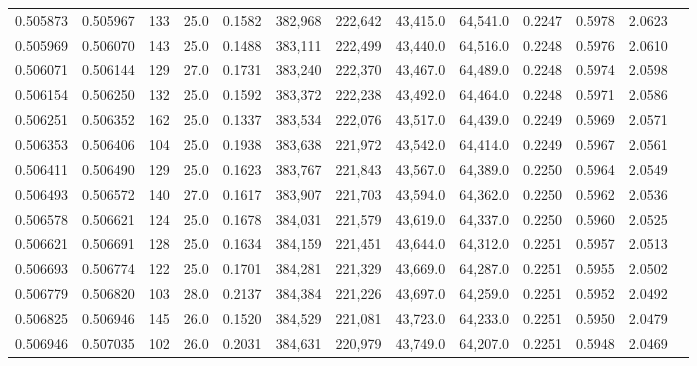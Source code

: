 \begin{tabular}{rrrrrrrrrrrrr}
0.505873 & 0.505967 &   133 & 25.0 &                                     0.1582 & 382,968 & 222,642 &  43,415.0 &  64,541.0 & 0.2247 & 0.5978 & 2.0623 \\
0.505969 & 0.506070 &   143 & 25.0 &                                     0.1488 & 383,111 & 222,499 &  43,440.0 &  64,516.0 & 0.2248 & 0.5976 & 2.0610 \\
0.506071 & 0.506144 &   129 & 27.0 &                                     0.1731 & 383,240 & 222,370 &  43,467.0 &  64,489.0 & 0.2248 & 0.5974 & 2.0598 \\
0.506154 & 0.506250 &   132 & 25.0 &                                     0.1592 & 383,372 & 222,238 &  43,492.0 &  64,464.0 & 0.2248 & 0.5971 & 2.0586 \\
0.506251 & 0.506352 &   162 & 25.0 &                                     0.1337 & 383,534 & 222,076 &  43,517.0 &  64,439.0 & 0.2249 & 0.5969 & 2.0571 \\
0.506353 & 0.506406 &   104 & 25.0 &                                     0.1938 & 383,638 & 221,972 &  43,542.0 &  64,414.0 & 0.2249 & 0.5967 & 2.0561 \\
0.506411 & 0.506490 &   129 & 25.0 &                                     0.1623 & 383,767 & 221,843 &  43,567.0 &  64,389.0 & 0.2250 & 0.5964 & 2.0549 \\
0.506493 & 0.506572 &   140 & 27.0 &                                     0.1617 & 383,907 & 221,703 &  43,594.0 &  64,362.0 & 0.2250 & 0.5962 & 2.0536 \\
0.506578 & 0.506621 &   124 & 25.0 &                                     0.1678 & 384,031 & 221,579 &  43,619.0 &  64,337.0 & 0.2250 & 0.5960 & 2.0525 \\
0.506621 & 0.506691 &   128 & 25.0 &                                     0.1634 & 384,159 & 221,451 &  43,644.0 &  64,312.0 & 0.2251 & 0.5957 & 2.0513 \\
0.506693 & 0.506774 &   122 & 25.0 &                                     0.1701 & 384,281 & 221,329 &  43,669.0 &  64,287.0 & 0.2251 & 0.5955 & 2.0502 \\
0.506779 & 0.506820 &   103 & 28.0 &                                     0.2137 & 384,384 & 221,226 &  43,697.0 &  64,259.0 & 0.2251 & 0.5952 & 2.0492 \\
0.506825 & 0.506946 &   145 & 26.0 &                                     0.1520 & 384,529 & 221,081 &  43,723.0 &  64,233.0 & 0.2251 & 0.5950 & 2.0479 \\
0.506946 & 0.507035 &   102 & 26.0 &                                     0.2031 & 384,631 & 220,979 &  43,749.0 &  64,207.0 & 0.2251 & 0.5948 & 2.0469 \\

\end{tabular}

